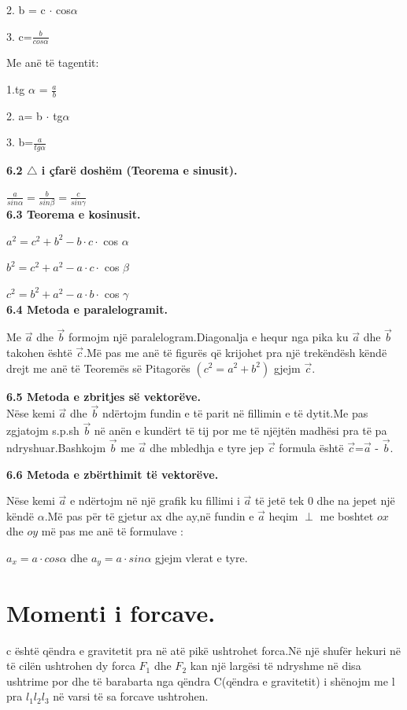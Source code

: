 \documentclass[twocolumn]{article}
\begin{document}
	2. b = c $\cdot$ cos$\alpha$
	
	3. c=$\frac{b}{cos \alpha}$
	\begin{center}
		Me anë të tagentit:
	\end{center}
	
	1.tg $\alpha$ = $\frac{a}{b}$
	
	2. a= b $\cdot$ tg$\alpha$
	
	3. b=$\frac{a}{tg \alpha}$
	
	
	\textbf{6.2 $\triangle$ i çfarë doshëm (Teorema e sinusit).}
	
	$\frac{a}{sin \alpha}=\frac{b}{sin \beta}=\frac{c}{sin \gamma}$\\
	
	
	\textbf{6.3 Teorema e kosinusit.}
	
	$a^2=c^2+b^2 -b\cdot c \cdot$ cos $\alpha$
	
	$b^2=c^2+a^2 -a\cdot c \cdot$ cos $\beta$
	
	$c^2=b^2+a^2 -a\cdot b \cdot$ cos $\gamma$\\
	
	
	\textbf{6.4 Metoda e paralelogramit.}
	
	Me $\vec{a}$ dhe $\vec{b}$ formojm një paralelogram.Diagonalja e hequr nga pika ku $\vec{a}$ dhe $\vec{b}$ takohen është $\vec{c}$.Më pas me anë të figurës që krijohet pra një trekëndësh këndë drejt me anë të Teoremës së Pitagorës $(c^2=a^2+b^2)$ gjejm $\vec{c}$.
	
	\textbf{6.5 Metoda e zbritjes së vektorëve.}\\
	
	Nëse kemi $\vec{a}$ dhe $\vec{b}$ ndërtojm fundin e të parit në fillimin e të dytit.Me pas zgjatojm  s.p.sh $\vec{b}$ në  anën  e  kundërt  të  tij  por  me  të  njëjtën  madhësi  pra  të pa  ndryshuar.Bashkojm $\vec{b}$ me $\vec{a}$ dhe  mbledhja  e  tyre  jep $\vec{c}$ formula  është $\vec{c}$=$\vec{a}$ - $\vec{b}$.
	
	\textbf{6.6 Metoda e zbërthimit të vektorëve.}
	
	Nëse kemi $\vec{a}$ e ndërtojm në një grafik ku fillimi i $\vec{a}$ të jetë tek 0 dhe na jepet një këndë $\alpha$.Më pas për të gjetur ax dhe ay,në fundin e $\vec{a}$ heqim  $\perp$ me boshtet $ox$ dhe $oy$ më pas me anë të formulave :
	
	$a_x=a \cdot cos\alpha$ dhe $ a_y=a \cdot sin\alpha$ gjejm vlerat e tyre.
	
	\section{Momenti i forcave.}
	c është qëndra e gravitetit pra në atë pikë ushtrohet forca.Në një shufër hekuri në të cilën
	ushtrohen dy forca $F_1$ dhe $F_2$ kan një largësi të ndryshme në disa ushtrime por dhe të
	barabarta nga qëndra C(qëndra e gravitetit) i shënojm me l pra $l_1 l_2 l_3$ në varsi të sa
	forcave ushtrohen.
	
\end{document}
